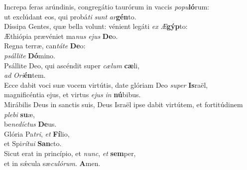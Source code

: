 \oddverse Increpa feras arúndinis, congregátio taurórum in vaccis \textit{po}\textit{pu}\textbf{ló}rum:~\*\\
\oddverse ut exclúdant eos, qui probá\textit{ti} \textit{sunt} \textit{ar}\textbf{gén}to.\\
\evenverse Díssipa Gentes, quæ bella volunt: vénient legáti \textit{ex} \textit{Æ}\textbf{gýp}to:~\*\\
\evenverse Æthiópia prævéniet ma\textit{nus} \textit{e}\textit{jus} \textbf{De}o.\\
\oddverse Regna terræ, can\textit{tá}\textit{te} \textbf{De}o:~\*\\
\oddverse \textit{psál}\textit{li}\textit{te} \textbf{Dó}mino.\\
\evenverse Psállite Deo, qui ascéndit super \textit{cæ}\textit{lum} \textbf{cæ}li,~\*\\
\evenverse \textit{ad} \textit{O}\textit{ri}\textbf{én}tem.\\
\oddverse Ecce dabit voci suæ vocem virtútis, date glóriam Deo \textit{su}\textit{per} \textbf{Is}raël,~\*\\
\oddverse magnificéntia ejus, et virtus \textit{e}\textit{jus} \textit{in} \textbf{nú}bibus.\\
\evenverse Mirábilis Deus in sanctis suis, Deus Israël ipse dabit virtútem, et fortitúdinem \textit{ple}\textit{bi} \textbf{su}æ,~\*\\
\evenverse be\textit{ne}\textit{dí}\textit{ctus} \textbf{De}us.\\
\oddverse Glória Pa\textit{tri}, \textit{et} \textbf{Fí}lio,~\*\\
\oddverse et Spi\textit{rí}\textit{tu}\textit{i} \textbf{San}cto.\\
\evenverse Sicut erat in princípio, et \textit{nunc}, \textit{et} \textbf{sem}per,~\*\\
\evenverse et in sǽcula sæ\textit{cu}\textit{ló}\textit{rum}. \textbf{A}men.\\
